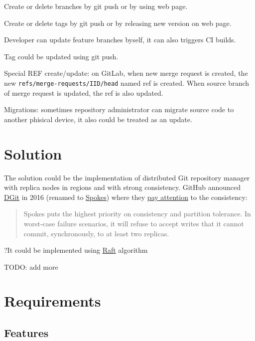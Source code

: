 \documentclass[12pt,oneside]{article}
\begin{document}
\begin{description}
  \item Create or delete branches by git push or by using web page.
  \item Create or delete tags by git push or by releasing new version on web page.
  \item Developer can update feature branches byself, it can also triggers CI builds.
  \item Tag could be updated using git push.
  \item Special REF create/update: on GitLab, when new merge request is created,
    the new \texttt{refs/merge-requests/IID/head} named ref
    is created. When source branch of merge request is updated, the ref is also updated.
  \item Migrations: sometimes repository administrator can migrate source code to
    another phisical device, it also could be treated as an update.
\end{description}

\section{Solution}

The solution could be the implementation of distributed Git repository manager with
replica nodes in regions and with strong consistency.
GitHub announced \href{https://github.blog/2016-04-05-introducing-dgit/}{DGit}
in 2016 (renamed to \href{https://github.blog/2016-09-07-building-resilience-in-spokes/}{Spokes})
where they \href{https://github.blog/2016-09-07-building-resilience-in-spokes/#defining-resilience}{pay attention}
to the consistency:
\begin{quote}
Spokes puts the highest priority on consistency and partition tolerance.
In worst-case failure scenarios, it will refuse to accept writes that it cannot commit,
synchronously, to at least two replicas.
\end{quote}

?It could be implemented using \href{https://raft.github.io/raft.pdf}{Raft} algorithm

TODO: add more

\section{Requirements}
\label{sec:requirements}

\subsection{Features}
\label{sec:features}
\end{document}
